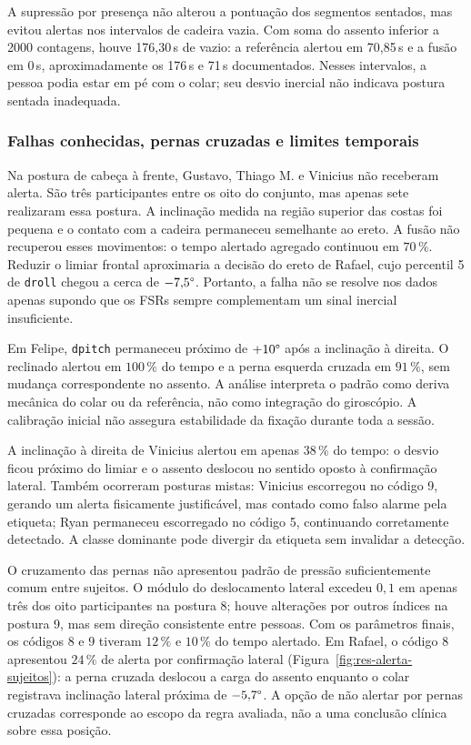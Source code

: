 A supressão por presença não alterou a pontuação dos segmentos sentados,
mas evitou alertas nos intervalos de cadeira vazia. Com soma do assento
inferior a 2000 contagens, houve 176{,}30\,s de vazio: a referência alertou
em 70{,}85\,s e a fusão em 0\,s, aproximadamente os 176\,s e
71\,s documentados. Nesses intervalos, a pessoa podia estar em pé com o
colar; seu desvio inercial não indicava postura sentada inadequada.

\subsubsection{Falhas conhecidas, pernas cruzadas e limites temporais}

Na postura de cabeça à frente, Gustavo, Thiago M. e Vinicius não receberam
alerta. São três participantes entre os oito do conjunto, mas apenas sete
realizaram essa postura. A inclinação medida na região superior das costas
foi pequena e o contato com a cadeira permaneceu semelhante ao ereto. A fusão
não recuperou esses movimentos: o tempo alertado agregado continuou em
$70\,\%$. Reduzir o limiar frontal aproximaria a decisão do ereto de Rafael,
cujo percentil 5 de \texttt{droll} chegou a cerca de $-7{,}5\degree{}$.
Portanto, a falha não se resolve nos dados apenas supondo que os FSRs sempre
complementam um sinal inercial insuficiente.

Em Felipe, \texttt{dpitch} permaneceu próximo de $+10\degree{}$ após a
inclinação à direita. O reclinado alertou em $100\,\%$ do tempo e a perna
esquerda cruzada em $91\,\%$, sem mudança correspondente no assento.
A análise interpreta o padrão como deriva mecânica do colar ou da referência,
não como integração do giroscópio. A calibração inicial não assegura
estabilidade da fixação durante toda a sessão.

A inclinação à direita de Vinicius alertou em apenas $38\,\%$ do tempo:
o desvio ficou próximo do limiar e o assento deslocou no sentido oposto à
confirmação lateral. Também ocorreram posturas mistas: Vinicius escorregou
no código 9, gerando um alerta fisicamente justificável, mas contado como
falso alarme pela etiqueta; Ryan permaneceu escorregado no código 5,
continuando corretamente detectado. A classe dominante pode divergir da
etiqueta sem invalidar a detecção.

O cruzamento das pernas não apresentou padrão de pressão suficientemente
comum entre sujeitos. O módulo do deslocamento lateral excedeu $0{,}1$ em
apenas três dos oito participantes na postura 8; houve alterações por outros
índices na postura 9, mas sem direção consistente entre pessoas.
Com os parâmetros finais, os códigos 8 e 9 tiveram $12\,\%$ e $10\,\%$
do tempo alertado. Em Rafael, o código 8 apresentou $24\,\%$ de alerta por
confirmação lateral (Figura~\ref{fig:res-alerta-sujeitos}): a perna cruzada
deslocou a carga do assento enquanto o colar registrava inclinação lateral
próxima de $-5{,}7\degree{}$. A opção de não alertar
por pernas cruzadas corresponde ao escopo da regra avaliada, não a uma
conclusão clínica sobre essa posição.

